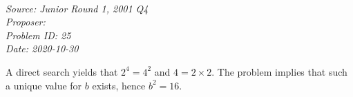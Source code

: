 \SSbreak\\
\emph{Source: \Csmo Junior Round 1, 2001 Q4}\\
\emph{Proposer: \Pbrain}\\
\emph{Problem ID: 25}\\
\emph{Date: 2020-10-30}\\
\SSbreak

\bigskip

\begin{solution}\hfil\medskip

    A direct search yields that $2^4 = 4^2$ and $4 = 2 \times 2$. 
    The problem implies that such a unique value for $b$ exists, hence $b^2 = \boxed{16}$.
\end{solution}\bigskip